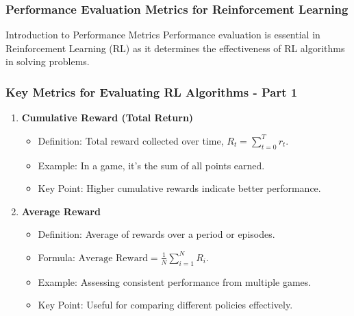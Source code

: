 \documentclass[aspectratio=169]{beamer}
\begin{document}
\begin{frame}[fragile]
    \frametitle{Performance Evaluation Metrics for Reinforcement Learning}
    \begin{block}{Introduction to Performance Metrics}
        Performance evaluation is essential in Reinforcement Learning (RL) as it determines the effectiveness of RL algorithms in solving problems.
    \end{block}
\end{frame}

\begin{frame}[fragile]
    \frametitle{Key Metrics for Evaluating RL Algorithms - Part 1}
    \begin{enumerate}
        \item \textbf{Cumulative Reward (Total Return)}
            \begin{itemize}
                \item Definition: Total reward collected over time, \( R_t = \sum_{t=0}^{T} r_t \).
                \item Example: In a game, it's the sum of all points earned.
                \item Key Point: Higher cumulative rewards indicate better performance.
            \end{itemize}

        \item \textbf{Average Reward}
            \begin{itemize}
                \item Definition: Average of rewards over a period or episodes.
                \item Formula: \( \text{Average Reward} = \frac{1}{N} \sum_{i=1}^N R_i \).
                \item Example: Assessing consistent performance from multiple games.
                \item Key Point: Useful for comparing different policies effectively.
            \end{itemize}
    \end{enumerate}
\end{frame}
\end{document}
